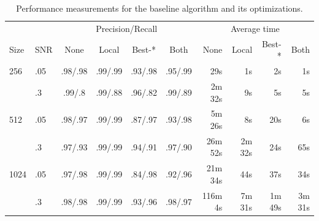 \documentclass{llncs}
\begin{document}
\begin{table}
\caption{Performance measurements for the baseline algorithm and its optimizations.}
\label{table:optimize}
\begin{tabular*}{\textwidth}{l @{\extracolsep{\fill}}lccccrrrr}
\toprule
 & & \multicolumn{4}{c}{Precision/Recall} & \multicolumn{4}{c}{Average time}\\
 \cmidrule(l){3-6} \cmidrule(l){7-10} 
 Size & SNR & None & Local & Best-* & Both & None & Local & Best-* & Both \\
\midrule
 256 & .05 & .98/.98 & .99/.99 & .93/.98 & .95/.99 & 29s & 1s & 2s & 1s \\
   & .3 &.99/.8 & .99/.88 & .96/.82 & .99/.89 & 2m 32s & 9s & 5s & 5s \\
 512 & .05 & .98/.97 & .99/.99 & .87/.97 & .93/.98 & 5m 26s & 8s & 20s & 6s \\
  & .3 &.97/.93 & .99/.99 & .94/.91 & .97/.90 & 26m 52s & 2m 32s & 24s & 65s \\
 1024 & .05 & .97/.98 & .99/.99 & .84/.98 & .92/.96 & 21m 34s & 44s & 37s & 34s \\
 & .3 &.98/.98 & .99/.99 & .93/.96 & .98/.97 & 116m 4s & 7m 31s & 1m 49s & 3m 31s \\
\bottomrule
\end{tabular*}
\end{table}
\end{document}
